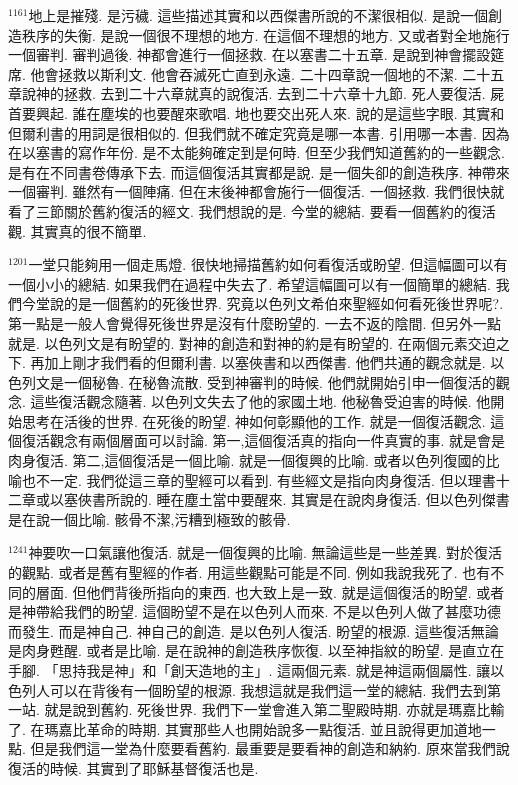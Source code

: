 \documentclass{book}
\begin{document}
$^{1161}$地上是摧殘.
是污穢.
這些描述其實和以西傑書所說的不潔很相似.
是說一個創造秩序的失衡.
是說一個很不理想的地方.
在這個不理想的地方.
又或者對全地施行一個審判.
審判過後.
神都會進行一個拯救.
在以塞書二十五章.
是說到神會擺設筵席.
他會拯救以斯利文.
他會吞滅死亡直到永遠.
二十四章說一個地的不潔.
二十五章說神的拯救.
去到二十六章就真的說復活.
去到二十六章十九節.
死人要復活.
屍首要興起.
誰在塵埃的也要醒來歌唱.
地也要交出死人來.
說的是這些字眼.
其實和但爾利書的用詞是很相似的.
但我們就不確定究竟是哪一本書.
引用哪一本書.
因為在以塞書的寫作年份.
是不太能夠確定到是何時.
但至少我們知道舊約的一些觀念.
是有在不同書卷傳承下去.
而這個復活其實都是說.
是一個失卻的創造秩序.
神帶來一個審判.
雖然有一個陣痛.
但在末後神都會施行一個復活.
一個拯救.
我們很快就看了三節關於舊約復活的經文.
我們想說的是.
今堂的總結.
要看一個舊約的復活觀.
其實真的很不簡單.

$^{1201}$一堂只能夠用一個走馬燈.
很快地掃描舊約如何看復活或盼望.
但這幅圖可以有一個小小的總結.
如果我們在過程中失去了.
希望這幅圖可以有一個簡單的總結.
我們今堂說的是一個舊約的死後世界.
究竟以色列文希伯來聖經如何看死後世界呢?.
第一點是一般人會覺得死後世界是沒有什麼盼望的.
一去不返的陰間.
但另外一點就是.
以色列文是有盼望的.
對神的創造和對神的約是有盼望的.
在兩個元素交迫之下.
再加上剛才我們看的但爾利書.
以塞俠書和以西傑書.
他們共通的觀念就是.
以色列文是一個秘魯.
在秘魯流散.
受到神審判的時候.
他們就開始引申一個復活的觀念.
這些復活觀念隨著.
以色列文失去了他的家國土地.
他秘魯受迫害的時候.
他開始思考在活後的世界.
在死後的盼望.
神如何彰顯他的工作.
就是一個復活觀念.
這個復活觀念有兩個層面可以討論.
第一,這個復活真的指向一件真實的事.
就是會是肉身復活.
第二,這個復活是一個比喻.
就是一個復興的比喻.
或者以色列復國的比喻也不一定.
我們從這三章的聖經可以看到.
有些經文是指向肉身復活.
但以理書十二章或以塞俠書所說的.
睡在塵土當中要醒來.
其實是在說肉身復活.
但以色列傑書是在說一個比喻.
骸骨不潔,污糟到極致的骸骨.

$^{1241}$神要吹一口氣讓他復活.
就是一個復興的比喻.
無論這些是一些差異.
對於復活的觀點.
或者是舊有聖經的作者.
用這些觀點可能是不同.
例如我說我死了.
也有不同的層面.
但他們背後所指向的東西.
也大致上是一致.
就是這個復活的盼望.
或者是神帶給我們的盼望.
這個盼望不是在以色列人而來.
不是以色列人做了甚麼功德而發生.
而是神自己.
神自己的創造.
是以色列人復活.
盼望的根源.
這些復活無論是肉身甦醒.
或者是比喻.
是在說神的創造秩序恢復.
以至神指紋的盼望.
是直立在手腳.
「思持我是神」和「創天造地的主」.
這兩個元素.
就是神這兩個屬性.
讓以色列人可以在背後有一個盼望的根源.
我想這就是我們這一堂的總結.
我們去到第一站.
就是說到舊約.
死後世界.
我們下一堂會進入第二聖殿時期.
亦就是瑪嘉比輸了.
在瑪嘉比革命的時期.
其實那些人也開始說多一點復活.
並且說得更加道地一點.
但是我們這一堂為什麼要看舊約.
最重要是要看神的創造和納約.
原來當我們說復活的時候.
其實到了耶穌基督復活也是.
\end{document}
